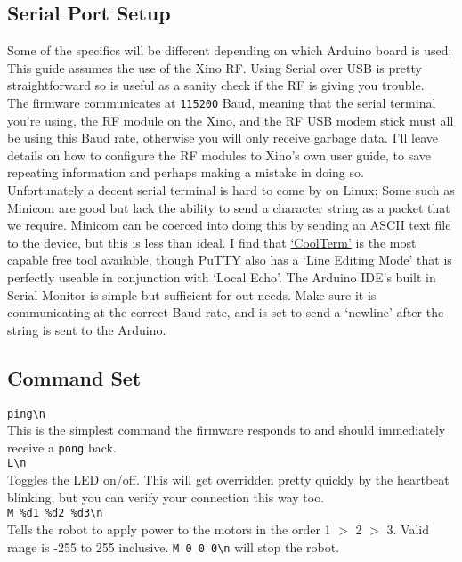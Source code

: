 \subsection{Serial Port Setup}

Some of the specifics will be different depending on which Arduino board is used; This guide assumes the use of the Xino RF. Using Serial over USB is pretty straightforward so is useful as a sanity check if the RF is giving you trouble.\\

The firmware communicates at \texttt{115200} Baud, meaning that the serial terminal you're using, the RF module on the Xino, and the RF USB modem stick must all be using this Baud rate, otherwise you will only receive garbage data. I'll leave details on how to configure the RF modules to Xino's own user guide, to save repeating information and perhaps making a mistake in doing so.\\

Unfortunately a decent serial terminal is hard to come by on Linux; Some such as Minicom are good but lack the ability to send a character string as a packet that we require. Minicom can be coerced into doing this by sending an ASCII text file to the device, but this is less than ideal. I find that \href{http://freeware.the-meiers.org/}{`CoolTerm'} is the most capable free tool available, though PuTTY also has a `Line Editing Mode' that is perfectly useable in conjunction with `Local Echo'. The Arduino IDE's built in Serial Monitor is simple but sufficient for out needs. Make sure it is communicating at the correct Baud rate, and is set to send a `newline' after the string is sent to the Arduino.

\subsection{Command Set}


\verb|ping\n|\\
This is the simplest command the firmware responds to and should immediately receive a \verb|pong| back.\\


\verb|L\n|\\
Toggles the LED on/off. This will get overridden pretty quickly by the heartbeat blinking, but you can verify your connection this way too.\\


\verb|M %d1 %d2 %d3\n|\\
Tells the robot to apply power to the motors in the order 1 $>$ 2 $>$ 3. Valid range is -255 to 255 inclusive. \verb|M 0 0 0\n| will stop the robot.


